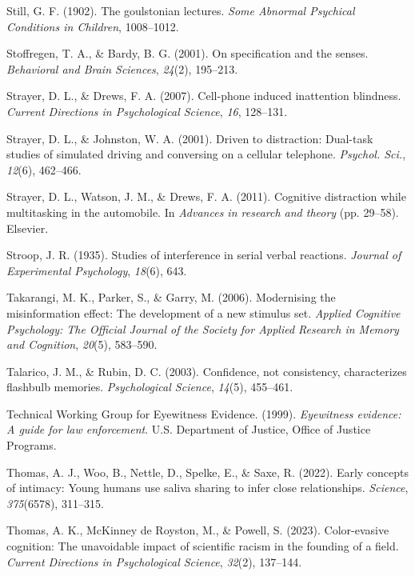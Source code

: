 \documentclass[
]{krantz}
\newlength{\cslhangindent}
\newenvironment{CSLReferences}[2] %
 {\begin{list}{}{%
  \setlength{\itemindent}{0pt}
  \setlength{\leftmargin}{0pt}
  \setlength{\parsep}{0pt}
  \ifodd #1
   \setlength{\leftmargin}{\cslhangindent}
   \setlength{\itemindent}{-1\cslhangindent}
  \fi
  \setlength{\itemsep}{#2\baselineskip}}}
 {\end{list}}
\begin{document}
\begin{CSLReferences}{1}{0}
Still, G. F. (1902). The goulstonian lectures. \emph{Some Abnormal Psychical Conditions in Children}, 1008--1012.

Stoffregen, T. A., \& Bardy, B. G. (2001). On specification and the senses. \emph{Behavioral and Brain Sciences}, \emph{24}(2), 195--213.

Strayer, D. L., \& Drews, F. A. (2007). Cell-phone induced inattention blindness. \emph{Current Directions in Psychological Science}, \emph{16}, 128--131.

Strayer, D. L., \& Johnston, W. A. (2001). Driven to distraction: Dual-task studies of simulated driving and conversing on a cellular telephone. \emph{Psychol. Sci.}, \emph{12}(6), 462--466.

Strayer, D. L., Watson, J. M., \& Drews, F. A. (2011). Cognitive distraction while multitasking in the automobile. In \emph{Advances in research and theory} (pp. 29--58). Elsevier.

Stroop, J. R. (1935). Studies of interference in serial verbal reactions. \emph{Journal of Experimental Psychology}, \emph{18}(6), 643.

Takarangi, M. K., Parker, S., \& Garry, M. (2006). Modernising the misinformation effect: The development of a new stimulus set. \emph{Applied Cognitive Psychology: The Official Journal of the Society for Applied Research in Memory and Cognition}, \emph{20}(5), 583--590.

Talarico, J. M., \& Rubin, D. C. (2003). Confidence, not consistency, characterizes flashbulb memories. \emph{Psychological Science}, \emph{14}(5), 455--461.

Technical Working Group for Eyewitness Evidence. (1999). \emph{Eyewitness evidence: A guide for law enforcement}. U.S. Department of Justice, Office of Justice Programs.

Thomas, A. J., Woo, B., Nettle, D., Spelke, E., \& Saxe, R. (2022). Early concepts of intimacy: Young humans use saliva sharing to infer close relationships. \emph{Science}, \emph{375}(6578), 311--315.

Thomas, A. K., McKinney de Royston, M., \& Powell, S. (2023). Color-evasive cognition: The unavoidable impact of scientific racism in the founding of a field. \emph{Current Directions in Psychological Science}, \emph{32}(2), 137--144.


\end{CSLReferences}
\end{document}
